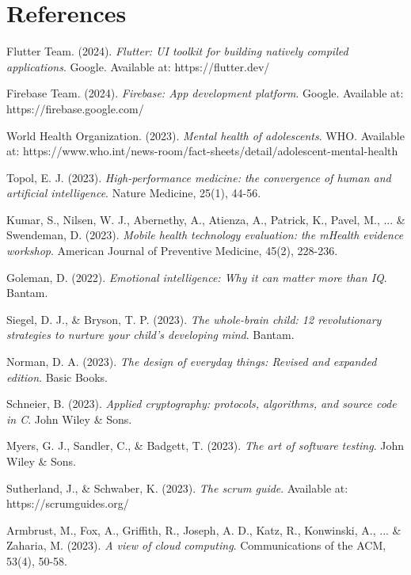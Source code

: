 ﻿\documentclass[12pt,a4paper]{article}
\newcommand{\chaptertitle}[1]{\section{#1}}
\begin{document}
\chaptertitle{References}

\begin{thebibliography}{99}

Flutter Team. (2024). \textit{Flutter: UI toolkit for building natively compiled applications}. Google. Available at: https://flutter.dev/

Firebase Team. (2024). \textit{Firebase: App development platform}. Google. Available at: https://firebase.google.com/

World Health Organization. (2023). \textit{Mental health of adolescents}. WHO. Available at: https://www.who.int/news-room/fact-sheets/detail/adolescent-mental-health

Topol, E. J. (2023). \textit{High-performance medicine: the convergence of human and artificial intelligence}. Nature Medicine, 25(1), 44-56.

Kumar, S., Nilsen, W. J., Abernethy, A., Atienza, A., Patrick, K., Pavel, M., ... \& Swendeman, D. (2023). \textit{Mobile health technology evaluation: the mHealth evidence workshop}. American Journal of Preventive Medicine, 45(2), 228-236.

Goleman, D. (2022). \textit{Emotional intelligence: Why it can matter more than IQ}. Bantam.

Siegel, D. J., \& Bryson, T. P. (2023). \textit{The whole-brain child: 12 revolutionary strategies to nurture your child's developing mind}. Bantam.

Norman, D. A. (2023). \textit{The design of everyday things: Revised and expanded edition}. Basic Books.

Schneier, B. (2023). \textit{Applied cryptography: protocols, algorithms, and source code in C}. John Wiley \& Sons.

Myers, G. J., Sandler, C., \& Badgett, T. (2023). \textit{The art of software testing}. John Wiley \& Sons.

Sutherland, J., \& Schwaber, K. (2023). \textit{The scrum guide}. Available at: https://scrumguides.org/

Armbrust, M., Fox, A., Griffith, R., Joseph, A. D., Katz, R., Konwinski, A., ... \& Zaharia, M. (2023). \textit{A view of cloud computing}. Communications of the ACM, 53(4), 50-58.


\end{thebibliography}
\end{document}
